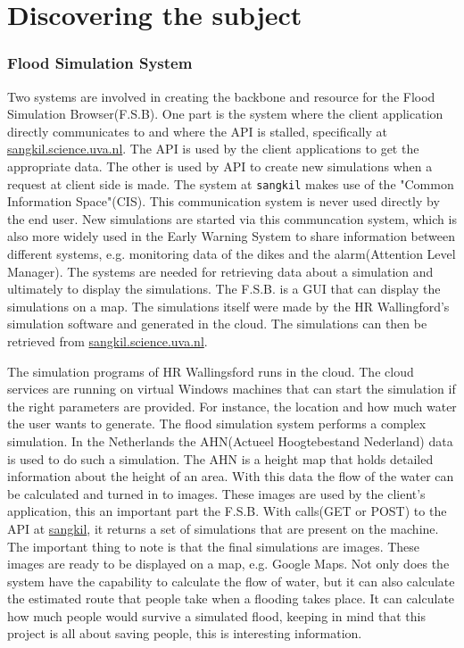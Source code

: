 \part{Discovering the subject}
\label{part:Discovering}
\section{Flood Simulation System}
Two systems are involved in creating the backbone and resource for the Flood Simulation Browser(F.S.B). One part is the system where the client application directly communicates to and where the API is stalled, specifically at \url{sangkil.science.uva.nl}. The API is used by the client applications to get the appropriate data. The other is used by API to create new simulations when a request at client side is made. The system at \texttt{sangkil} makes use of the "Common Information Space"(CIS)\cite{CIS}. This communication system is never used directly by the end user. New simulations are started via this communcation system, which is also more widely used in the Early Warning System to share information between different systems, e.g. monitoring data of the dikes and the alarm(Attention Level Manager). The systems are needed for retrieving data about a simulation and ultimately to display the simulations. The F.S.B. is a GUI that can display the simulations on a map. The simulations itself were made by the HR Wallingford's\cite{wallingford} simulation software and generated in the cloud\cite{cloud}. The simulations can then be retrieved from \url{sangkil.science.uva.nl}. 

The simulation programs of HR Wallingsford runs in the cloud. The cloud services are running on virtual Windows machines that can start the simulation if the right parameters are provided. For instance, the location and how much water the user wants to generate. The flood simulation system performs a complex simulation. In the Netherlands the AHN(Actueel Hoogtebestand Nederland) \cite{AHN} data is used to do such a simulation. The AHN is a height map that holds detailed information about the height of an area. With this data the flow of the water can be calculated and turned in to images. These images are used by the client's application, this an important part the F.S.B. With calls(GET or POST) to the API at \url{sangkil}, it returns a set of simulations that are present on the machine. The important thing to note is that the final simulations are images. These images are ready to be displayed on a map, e.g. Google Maps. 
Not only does the system have the capability to calculate the flow of water, but it can also calculate the estimated route that people take when a flooding takes place. It can calculate how much people would survive a simulated flood, keeping in mind that this project is all about saving people, this is interesting information.
 

